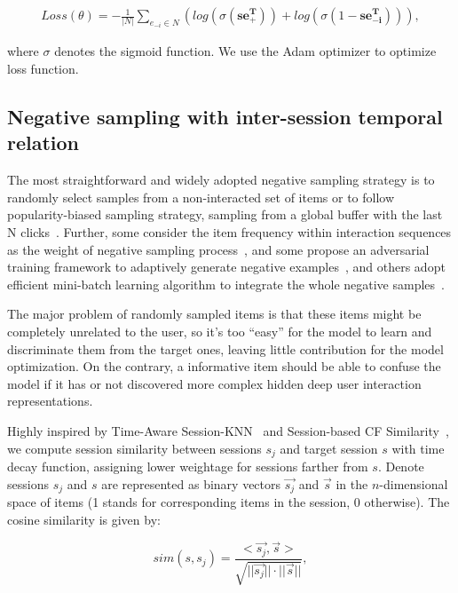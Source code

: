 \begin{equation}
    \begin{aligned}
    Loss(\theta) = - \frac{1}{|N|}\sum_{e_{-i}\in N} \left(log(\sigma(\mathbf{s} \mathbf{e_{+}^{T}})) 
    + log(\sigma(1-\mathbf{s} \mathbf{e_{-i}^{T}}))\right),
    \end{aligned}
\end{equation}

where $\sigma$ denotes the sigmoid function. We use the Adam optimizer to optimize loss function. 

\subsection{Negative sampling with inter-session temporal relation}
\label{sec:3.3}
The most straightforward and widely adopted negative sampling strategy is to randomly select samples from a non-interacted set of items or to follow popularity-biased sampling strategy, sampling from a global buffer with the last N clicks~\cite{moreira_news_2018}. Further, some consider the item frequency within interaction sequences as the weight of negative sampling process~\cite{li_learning_2018}, and some propose an adversarial training framework to adaptively generate negative examples~\cite{wang_neural_2018}, and others adopt efficient mini-batch learning algorithm to  integrate the whole negative samples~\cite{chen2020efficient}.

The major problem of randomly sampled items is that these items might be completely unrelated to the user, so it's too ``easy'' for the model
to learn and discriminate them from the target ones, leaving little contribution for the model optimization. On the contrary, a informative item should be able to confuse the model if it has or not discovered more complex hidden deep user interaction representations.

Highly inspired by Time-Aware Session-KNN~\cite{garg2019sequence} and Session-based CF Similarity~\cite{sottocornola2018session}, we compute session similarity between sessions $s_j$ and target session $s$ with time decay function, assigning lower weightage for sessions farther from $s$. Denote sessions $s_j$ and $s$ are represented as binary vectors $\vec{s_j}$ and $\vec{s}$ in the $n$-dimensional space of items (1 stands for corresponding items in the session, 0 otherwise). The cosine similarity is given by:

\begin{equation}
    sim(s, s_j) = \frac{<\vec{s_j}, \vec{s}>}{\sqrt{||\vec{s_j}|| \cdot ||\vec{s}||}},
\end{equation}

